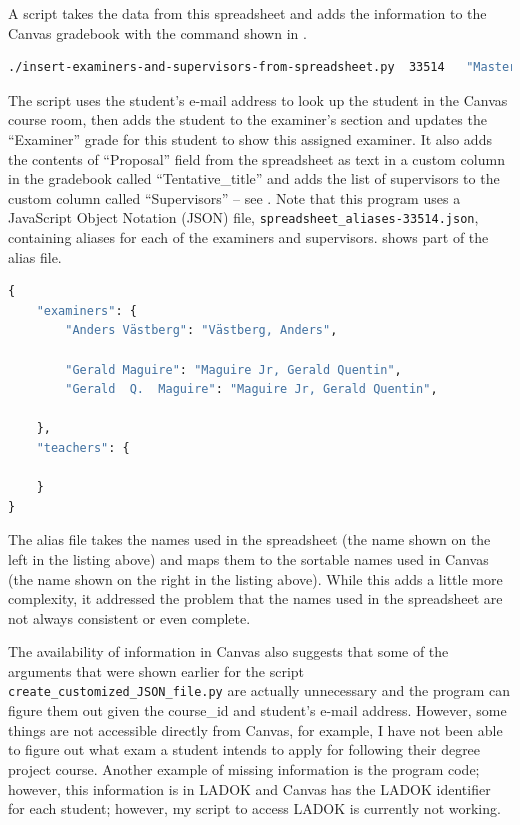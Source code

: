 A script takes the data from this spreadsheet and adds the information to the Canvas gradebook with the command shown in .
\begin{lstlisting}[language={bash}, caption={insert-examiners-and-supervisors-from-spreadsheet.py}, label=lst:insertExaminersAndSupervisorsFromSpreadsheet]
./insert-examiners-and-supervisors-from-spreadsheet.py  33514   "Masters_thesis_proposals-CS-P3-2022a.xlsx"  
\end{lstlisting}
The script uses the student’s e-mail address to look up the student in the Canvas course room, then adds the student to the examiner’s section and updates the “Examiner” grade for this student to show this assigned examiner. It also adds the contents of “Proposal” field from the spreadsheet as text in a custom column in the gradebook called “Tentative\_title” and adds the list of supervisors to the custom column called “Supervisors” – see . Note that this program uses a JavaScript Object Notation (JSON) file, \texttt{spreadsheet\_aliases-33514.json}, containing aliases for each of the examiners and supervisors.  shows part of the alias file.
\begin{lstlisting}[language={Python}, caption={Some of the contents of an alias file for a course}, label=lst:aliasFile]
{
    "examiners": {
        "Anders Västberg": "Västberg, Anders",

        "Gerald Maguire": "Maguire Jr, Gerald Quentin",
        "Gerald  Q.  Maguire": "Maguire Jr, Gerald Quentin",

    },
    "teachers": {
    
    }
}
\end{lstlisting}

The alias file takes the names used in the spreadsheet (the name shown on the left in the listing above) and maps them to the sortable names used in Canvas (the name shown on the right in the listing above). While this adds a little more complexity, it addressed the problem that the names used in the spreadsheet are not always consistent or even complete.

The availability of information in Canvas also suggests that some of the arguments that were shown earlier for the script \texttt{create\_customized\_JSON\_file.py} are actually unnecessary and the program can figure them out given the course\_id and student’s e-mail address. However, some things are not accessible directly from Canvas, for example, I have not been able to figure out what exam a student intends to apply for following their degree project course. Another example of missing information is the program code; however, this information is in LADOK and Canvas has the LADOK identifier for each student; however, my script to access LADOK is currently not working.
